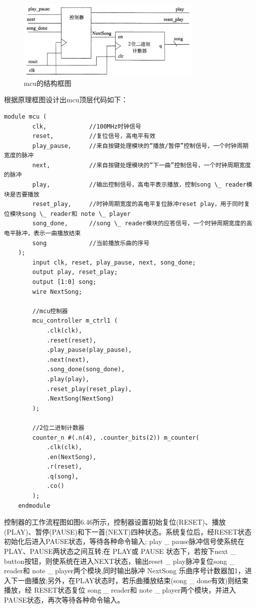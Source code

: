 \documentclass{../source/Experiment}
\begin{document}
                \begin{figure}[H]
                    \centering
                    \includegraphics[width = 0.8\textwidth]{pic/mcu.png}
                    \caption{mcu的结构框图}
                \end{figure}

                根据原理框图设计出mcu顶层代码如下：
                \begin{lstlisting}[name = mcu顶层代码]
    module mcu (
        clk,            //100MHz时钟信号
        reset,          //复位信号，高电平有效
        play_pause,     //来自按键处理模块的“播放/暂停”控制信号，一个时钟周期宽度的脉冲
        next,           //来自按键处理模块的“下一曲”控制信号，一个时钟周期宽度的脉冲
        play,           //输出控制信号，高电平表示播放，控制song \_ reader模块是否要播放
        reset_play,     //时钟周期宽度的高电平复位脉冲reset play，用于同时复位模块song \_ reader和 note \_ player
        song_done,      //song \_ reader模块的应答信号，一个时钟周期宽度的高电平脉冲，表示一曲播放结束
        song            //当前播放乐曲的序号
    );
        input clk, reset, play_pause, next, song_done;
        output play, reset_play;
        output [1:0] song;
        wire NextSong;

        //mcu控制器
        mcu_controller m_ctrl1 (
            .clk(clk),
            .reset(reset),
            .play_pause(play_pause),
            .next(next),
            .song_done(song_done),
            .play(play),
            .reset_play(reset_play),
            .NextSong(NextSong)
        );

        //2位二进制计数器
        counter_n #(.n(4), .counter_bits(2)) m_counter(
            .clk(clk),
            .en(NextSong),
            .r(reset),
            .q(song),
            .co()
        );
    endmodule
                \end{lstlisting}
                控制器的工作流程图如图6.46所示，控制器设置初始复位(RESET)、播放(PLAY)、暂停(PAUSE)和下一首(NEXT)四种状态。系统复位后，经RESET状态初始化后进入PAUSE状态，等待各种命令输入; play \_ pause脉冲信号使系统在 PLAY、PAUSE两状态之间互转;在 PLAY或 PAUSE 状态下，若按下next \_ button按钮，则使系统在进入NEXT状态，输出reset \_  play脉冲复位song  \_ reader和 note \_ player两个模块,同时输出脉冲 NextSong 乐曲序号计数器加1，进入下一曲播放;另外，在PLAY状态时，若乐曲播放结束(song \_ done有效)则结束播放，经 RESET状态复位 song \_ reader和 note \_ player两个模块，并进入 PAUSE状态，再次等待各种命令输入。
\end{document}
